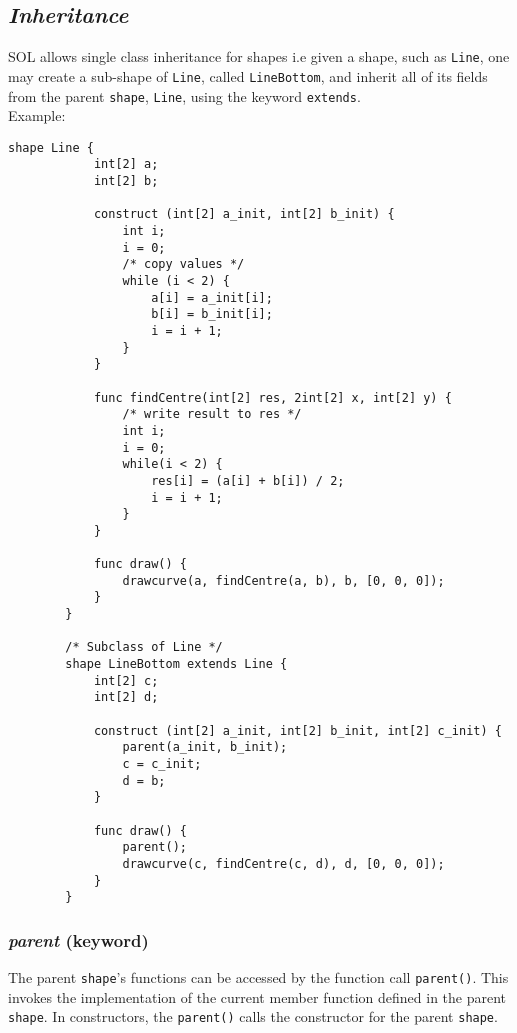 \documentclass[letterpaper,12pt]{article}
\begin{document}
    \subsection{\textit{Inheritance}}
    SOL allows single class inheritance for shapes i.e given a shape, such as \texttt{Line}, one may create a sub-shape of \texttt{Line}, called \texttt{LineBottom}, and inherit all of its fields from the parent \texttt{shape}, \texttt{Line}, using the keyword \texttt{extends}.\\
    Example:\\
    \begin{lstlisting}[style=sol]
        shape Line {
            int[2] a;
            int[2] b;
            
            construct (int[2] a_init, int[2] b_init) {
                int i;
                i = 0;
                /* copy values */
                while (i < 2) {
                    a[i] = a_init[i];
                    b[i] = b_init[i];
                    i = i + 1;
                }
            }

            func findCentre(int[2] res, 2int[2] x, int[2] y) {
                /* write result to res */
                int i;
                i = 0;
                while(i < 2) {
                    res[i] = (a[i] + b[i]) / 2;
                    i = i + 1;
                }
            }
            
            func draw() {
                drawcurve(a, findCentre(a, b), b, [0, 0, 0]);
            }
        }

        /* Subclass of Line */
        shape LineBottom extends Line {
            int[2] c;
            int[2] d;

            construct (int[2] a_init, int[2] b_init, int[2] c_init) {
                parent(a_init, b_init);
                c = c_init;
                d = b;
            }

            func draw() {
                parent();
                drawcurve(c, findCentre(c, d), d, [0, 0, 0]);
            }
        }
    \end{lstlisting}

    \subsubsection{\textit{parent} (keyword)}
    The parent \texttt{shape}'s functions can be accessed by the function call \texttt{parent()}. This invokes the implementation of the current member function defined in the parent \texttt{shape}. In constructors, the \texttt{parent()} calls the constructor for the parent \texttt{shape}.
\end{document}
